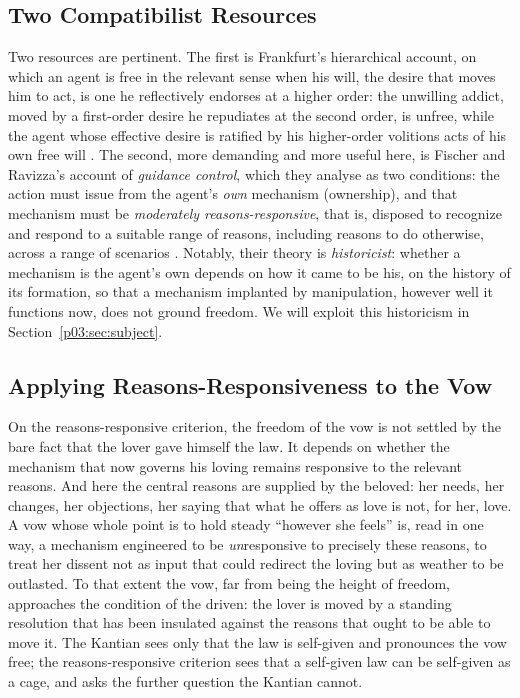 \documentclass[11pt,a4paper]{article}
\begin{document}
\subsection{Two Compatibilist Resources}

Two resources are pertinent. The first is Frankfurt's hierarchical account, on which an agent is free in the relevant sense when his will, the desire that moves him to act, is one he reflectively endorses at a higher order: the unwilling addict, moved by a first-order desire he repudiates at the second order, is unfree, while the agent whose effective desire is ratified by his higher-order volitions acts of his own free will \parencite{frankfurt1971freedom}. The second, more demanding and more useful here, is Fischer and Ravizza's account of \emph{guidance control}, which they analyse as two conditions: the action must issue from the agent's \emph{own} mechanism (ownership), and that mechanism must be \emph{moderately reasons-responsive}, that is, disposed to recognize and respond to a suitable range of reasons, including reasons to do otherwise, across a range of scenarios \parencite{fischer1998responsibility}. Notably, their theory is \emph{historicist}: whether a mechanism is the agent's own depends on how it came to be his, on the history of its formation, so that a mechanism implanted by manipulation, however well it functions now, does not ground freedom. We will exploit this historicism in Section~\ref{p03:sec:subject}.

\subsection{Applying Reasons-Responsiveness to the Vow}

On the reasons-responsive criterion, the freedom of the vow is not settled by the bare fact that the lover gave himself the law. It depends on whether the mechanism that now governs his loving remains responsive to the relevant reasons. And here the central reasons are supplied by the beloved: her needs, her changes, her objections, her saying that what he offers as love is not, for her, love. A vow whose whole point is to hold steady ``however she feels'' is, read in one way, a mechanism engineered to be \emph{un}responsive to precisely these reasons, to treat her dissent not as input that could redirect the loving but as weather to be outlasted. To that extent the vow, far from being the height of freedom, approaches the condition of the driven: the lover is moved by a standing resolution that has been insulated against the reasons that ought to be able to move it. The Kantian sees only that the law is self-given and pronounces the vow free; the reasons-responsive criterion sees that a self-given law can be self-given as a cage, and asks the further question the Kantian cannot.
\end{document}

